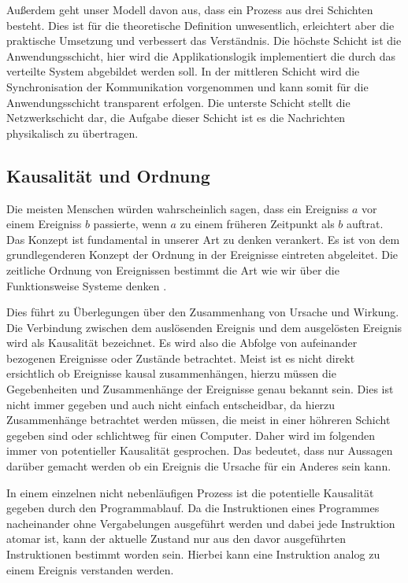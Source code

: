 Außerdem geht unser Modell davon aus, dass ein Prozess aus drei Schichten besteht.
Dies ist für die theoretische Definition unwesentlich, erleichtert aber die praktische Umsetzung und verbessert das Verständnis.
Die höchste Schicht ist die Anwendungsschicht, hier wird die Applikationslogik implementiert die durch das verteilte System abgebildet werden soll.
In der mittleren Schicht wird die Synchronisation der Kommunikation vorgenommen und kann somit für die Anwendungsschicht transparent  erfolgen.
Die unterste Schicht stellt die Netzwerkschicht dar, die Aufgabe dieser Schicht ist es die Nachrichten physikalisch zu übertragen.

\subsection{Kausalität und Ordnung}
\label{cap:ordnung}
Die meisten Menschen würden wahrscheinlich sagen, dass ein Ereigniss $a$ vor einem Ereigniss $b$ passierte, wenn $a$ zu einem früheren Zeitpunkt als $b$ auftrat.
Das Konzept  ist fundamental in unserer Art zu denken verankert.
Es ist von dem grundlegenderen Konzept der Ordnung in der Ereignisse eintreten abgeleitet.
Die zeitliche Ordnung von Ereignissen bestimmt die Art wie wir über die Funktionsweise Systeme denken \cite{Lamport1978}.

Dies führt zu Überlegungen über den Zusammenhang von Ursache und Wirkung.
Die Verbindung zwischen dem auslösenden Ereignis und dem ausgelösten Ereignis wird als Kausalität bezeichnet.
Es wird also die Abfolge von aufeinander bezogenen Ereignisse oder Zustände betrachtet.
Meist ist es nicht direkt ersichtlich ob Ereignisse kausal zusammenhängen, hierzu müssen die Gegebenheiten und Zusammenhänge der Ereignisse genau bekannt sein.
Dies ist nicht immer gegeben und auch nicht einfach entscheidbar, da hierzu Zusammenhänge betrachtet werden müssen, die meist in einer höhreren Schicht gegeben sind oder schlichtweg für einen Computer.
Daher wird im folgenden immer von potentieller Kausalität gesprochen.
Das bedeutet, dass nur Aussagen darüber gemacht werden ob ein Ereignis die Ursache für ein Anderes sein kann.

In einem einzelnen nicht nebenläufigen Prozess ist die potentielle Kausalität gegeben durch den Programmablauf.
Da die Instruktionen eines Programmes nacheinander ohne Vergabelungen ausgeführt werden und dabei jede Instruktion atomar ist, kann der aktuelle Zustand nur aus den davor ausgeführten Instruktionen bestimmt worden sein.
Hierbei kann eine Instruktion analog zu einem Ereignis verstanden werden.

